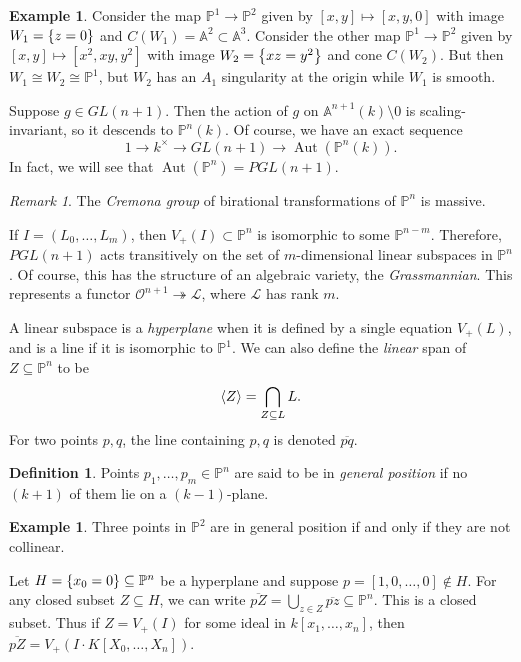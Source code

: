 \documentclass[leqno, openany]{memoir}
\theoremstyle{definition}
\newtheorem{defn}[thm]{Definition}
\newtheorem{exm}[thm]{Example}
\theoremstyle{remark}
\newtheorem{rmk}[thm]{Remark}
\theoremstyle{plain}
\theoremstyle{definition}
\theoremstyle{remark}
\newcommand{\A}{\mathbb{A}}
\renewcommand{\P}{\mathbb{P}}
\newcommand{\msc}[1]{\mathscr{#1}}
\newcommand{\ol}[1]{\overline{#1}}
\DeclareMathOperator{\Aut}{Aut}
\begin{document}
\begin{exm}
    Consider the map $\P^1 \to \P^2$ given by $[x,y] \mapsto [x,y,0]$ with image $W_1 = \qty{z = 0}$ and $C(W_1) = \A^2 \subset \A^3$. Consider the other map $\P^1 \to \P^2$ given by $[x,y] \mapsto [x^2, xy, y^2]$ with image $W_2 = \qty{xz = y^2}$ and cone $C(W_2)$. But then $W_1 \cong W_2 \cong \P^1$, but $W_2$ has an $A_1$ singularity at the origin while $W_1$ is smooth.
\end{exm}

Suppose $g \in GL(n+1)$. Then the action of $g$ on $\A^{n+1}(k) \setminus \qty{0}$ is scaling-invariant, so it descends to $\P^n(k)$. Of course, we have an exact sequence
\[ 1 \to k^{\times} \to GL(n+1) \to \Aut(\P^n(k)). \]
In fact, we will see that $\Aut(\P^n) = PGL(n+1)$.

\begin{rmk}
    The \textit{Cremona group} of birational transformations of $\P^n$ is massive.
\end{rmk}

If $I = (L_0, \ldots, L_m)$, then $V_+(I) \subset \P^n$ is isomorphic to some $\P^{n-m}$. Therefore, $PGL(n+1)$ acts transitively on the set of $m$-dimensional linear subspaces in $\P^n$. Of course, this has the structure of an algebraic variety, the \textit{Grassmannian}. This represents a functor $\msc{O}^{n+1} \twoheadrightarrow \msc{L}$, where $\msc{L}$ has rank $m$. 

A linear subspace is a \textit{hyperplane} when it is defined by a single equation $V_+(L)$, and is a line if it is isomorphic to $\P^1$. We can also define the \textit{linear} span of $Z \subseteq \P^n$ to be
\[ \ev{Z} = \bigcap_{Z \subseteq L} L. \]
For two points $p,q$, the line containing $p,q$ is denoted $\ol{pq}$.

\begin{defn}
    Points $p_1, \ldots, p_m \in \P^n$ are said to be in \textit{general position} if no $(k+1)$ of them lie on a $(k-1)$-plane.
\end{defn}

\begin{exm}
    Three points in $\P^2$ are in general position if and only if they are not collinear.
\end{exm}

Let $H = \qty{x_0 = 0} \subseteq \P^n$ be a hyperplane and suppose $p = [1,0,\ldots,0] \notin H$. For any closed subset $Z \subseteq H$, we can write $\ol{pZ} = \bigcup_{z \in Z} \ol{pz} \subseteq \P^n$. This is a closed subset. Thus if $Z = V_+(I)$ for some ideal in $k[x_1, \ldots, x_n]$, then $\ol{pZ} = V_+(I \cdot K[X_0, \ldots, X_n])$.
\end{document}
